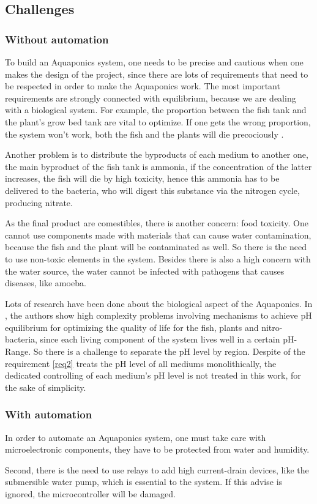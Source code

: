 \subsection{Challenges}

\subsubsection{Without automation}
To build an Aquaponics system,
one needs to be precise and cautious when one makes the design of the project,
since there are lots of requirements that need to be respected in order to make the Aquaponics work.
The most important requirements are strongly connected with equilibrium,
because we are dealing with a biological system.
For example,
the proportion between the fish tank and the plant's grow bed tank are vital to optimize.
If one gets the wrong proportion,
the system won't work,
both the fish and the plants will die precociously \cite{Leatherbury2014}.

Another problem is to distribute the byproducts of each medium to another one,
the main byproduct of the fish tank is ammonia,
if the concentration of the latter increases,
the fish will die by high toxicity,
hence this ammonia has to be delivered to the bacteria,
who will digest this substance via the nitrogen cycle,
producing nitrate.

As the final product are comestibles,
there is another concern: food toxicity.
One cannot use components made with materials that can cause water contamination,
because the fish and the plant will be contaminated as well.
So there is the need to use non-toxic elements in the system.
Besides there is also a high concern with the water source,
the water cannot be infected with pathogens that causes diseases,
like amoeba.

Lots of research have been done about the biological aspect of the Aquaponics.
In \cite{GoddekDelaideMankasinghEtAl2015},
the authors show high complexity problems involving mechanisms to achieve pH equilibrium for optimizing the quality of life for the fish,
plants and nitro-bacteria,
since each living component of the system lives well in a certain pH-Range.
So there is a challenge to separate the pH level by region.
Despite of the requirement \ref{req2} treats the pH level of all mediums monolithically,
the dedicated controlling of each medium's pH level is not treated in this work,
for the sake of simplicity.

\subsubsection{With automation}
In order to automate an Aquaponics system,
one must take care with microelectronic components,
they have to be protected from water and humidity.

Second,
there is the need to use relays to add high current-drain devices,
like the submersible water pump,
which is essential to the system.
If this advise is ignored,
the microcontroller will be damaged.
